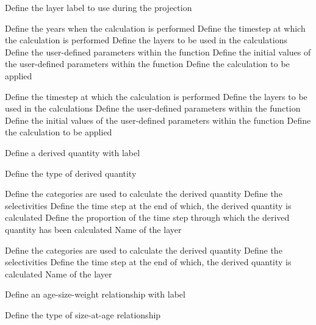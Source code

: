  {Define the layer label to use during the projection}
\par\textbf{}\par
{} {Define the years when the calculation is performed}
 {Define the timestep at which the calculation is performed}
 {Define the layers to be used in the calculations}
 {Define the user-defined parameters within the function}
 {Define the initial values of the user-defined parameters within the function}
 {Define the calculation to be applied}
\par\textbf{}\par
{} {Define the timestep at which the calculation is performed}
 {Define the layers to be used in the calculations}
 {Define the user-defined parameters within the function}
 {Define the initial values of the user-defined parameters within the function}
 {Define the calculation to be applied}
\par{} {Define a derived quantity with label}\par
{} {Define the type of derived quantity}
\par\textbf{}\par
{} {Define the categories are used to calculate the derived quantity}
 {Define the selectivities}
 {Define the time step at the end of which, the derived quantity is calculated}
 {Define the proportion of the time step through which the derived quantity has been calculated}
 {Name of the layer}
\par\textbf{}\par
{} {Define the categories are used to calculate the derived quantity}
 {Define the selectivities}
 {Define the time step at the end of which, the derived quantity is calculated}
 {Name of the layer}
\par{} {Define an age-size-weight relationship with label}\par
{} {Define the type of size-at-age relationship}
